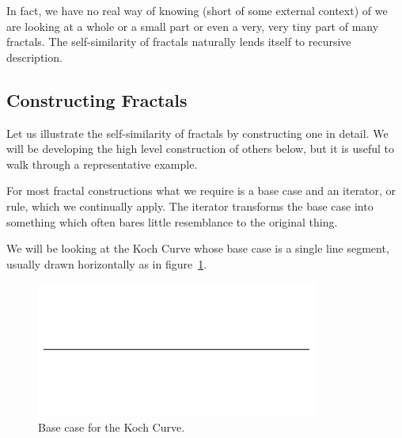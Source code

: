 \documentclass[jou,apacite]{apa6}
\begin{document}
In fact, we have no real way of knowing (short of some external context) of we are looking at a whole or a small part or even a very, very tiny part of many fractals.  The self-similarity of fractals naturally lends itself to recursive description.

\subsection{Constructing Fractals}
Let us illustrate the self-similarity of fractals by constructing one in detail.  We will be developing the high level construction of others below, but it is useful to walk through a representative example.

For most fractal constructions what we require is a base case and an iterator, or rule, which we continually apply.  The iterator transforms the base case into something which often bares little resemblance to the original thing.

We will be looking at the Koch Curve whose base case is a single line segment, usually drawn horizontally as in figure~\ref{fig:koch0}.
\begin{figure}[htpb]
  \centering
  \includegraphics[width=0.75\columnwidth]{images/Koch0.png}
  \caption{Base case for the Koch Curve.}
  \label{fig:koch0}
\end{figure}
\end{document}
